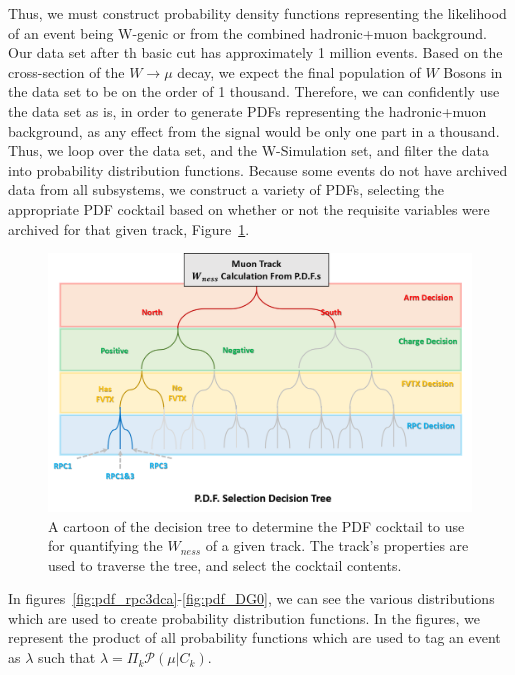 Thus, we must construct probability density functions representing the
likelihood of an event being W-genic or from the combined hadronic+muon
background. Our data set after th basic cut has approximately 1 million events.
Based on the cross-section of the $W\rightarrow \mu$ decay, we expect the final
population of $W$ Bosons in the data set to be on the order of 1 thousand.
Therefore, we can confidently use the data set as is, in order to generate PDFs
representing the hadronic+muon background, as any effect from the signal would
be only one part in a thousand. Thus, we loop over the data set, and the
W-Simulation set, and filter the data into probability distribution functions.
Because some events do not have archived data from all subsystems, we construct
a variety of PDFs, selecting the appropriate PDF cocktail based on whether or
not the requisite variables were archived for that given track,
Figure~\ref{fig:pdf_selection_tree}.

\begin{figure}[ht]
  \centering
  \includegraphics[width=\linewidth,trim=4 4 4 4,clip]{./figures/pdf_selection_tree.png}
  \caption{
    A cartoon of the decision tree to determine the PDF cocktail to use for
    quantifying the $W_{ness}$ of a given track. The track's properties are used
    to traverse the tree, and select the cocktail contents.
  }
  \label{fig:pdf_selection_tree}
\end{figure}

In figures~\ref{fig:pdf_rpc3dca}-\ref{fig:pdf_DG0}, we can see the various
distributions which are used to create probability distribution functions. In
the figures, we represent the product of all probability functions which are
used to tag an event as $\lambda$ such that 
$\lambda = \Pi_{k} \mathcal{P}(\mu \vert C_k)$.

